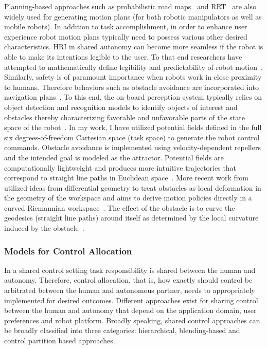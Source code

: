 \documentclass[12pt]{article}
\begin{document}
Planning-based approaches such as probabilistic road maps~\cite{kavraki1996analysis} and RRT~\cite{kuffner2000rrt} are also widely used for generating motion plans (for both robotic manipulators as well as mobile robots). In addition to task accomplishment, in order to enhance user experience robot motion plans typically need to possess various other desired characteristics. HRI in shared autonomy can become more seamless if the robot is able to make its intentions legible to the user. To that end researchers have attempted to mathematically define legibility and predictability of robot motion~\cite{dragan2013legibility}. Similarly, safety is of paramount importance when robots work in close proximity to humans. Therefore behaviors such as obstacle avoidance are incorporated into navigation plans~\cite{storms2014blending}. To this end, the on-board perception system typically relies on object detection and recognition models to identify objects of interest and obstacles thereby characterizing favorable and unfavorable parts of the state space of the robot~\cite{muller2006off}. In my work, I have utilized potential fields defined in the full six degrees-of-freedom Cartesian space (task space) to generate the robot control commands. Obstacle avoidance is implemented using velocity-dependent repellers and the intended goal is modeled as the attractor. Potential fields are computationally lightweight and produces more intuitive trajectories that correspond to straight line paths in Euclidean space~\cite{khatib1986real}. More recent work from utilized ideas from differential geometry to treat obstacles as local deformation in the geometry of the workspace and aims to derive motion policies directly in a curved Riemannian workspace~\cite{ratliff2018riemannian}. The effect of the obstacle is to curve the geodesics (straight line paths) around itself as determined by the local curvature induced by the obstacle~\cite{mainprice2016warping}. 
\subsubsection{Models for Control Allocation}

In a shared control setting task responsibility is shared between the human and autonomy. Therefore, control allocation, that is, how exactly should control be arbitrated between the human and autonomous partner, needs to appropriately implemented for desired outcomes. Different approaches exist for sharing control between the human and autonomy that depend on the application domain, user preferences and robot platform. 
Broadly speaking, shared control approaches can be broadly classified into three categories: hierarchical, blending-based and control partition based approaches. 
\end{document}
